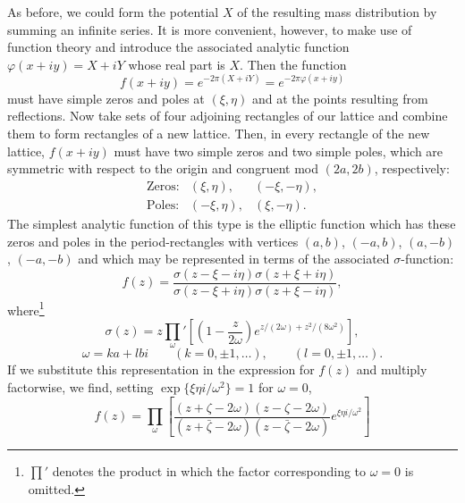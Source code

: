As before, we could form the potential $X$ of the resulting mass distribution by summing an infinite series. It is more convenient, however, to make use of function theory and introduce the associated analytic function $\varphi(x+iy)=X+iY$ whose real part is $X$. Then the function
\[
f(x+iy)=e^{-2\pi(X+iY)}=e^{-2\pi\varphi(x+iy)}
\]
must have simple zeros and poles at $(\xi,\eta)$ and at the points resulting from reflections. Now take sets of four adjoining rectangles of our lattice and combine them to form rectangles of a new lattice. Then, in every rectangle of the new lattice, $f(x+iy)$ must have two simple zeros and two simple poles, which are symmetric with respect to the origin and congruent mod $(2a,2b)$, respectively:
\[
\begin{array}{lll}
\text{Zeros:}&(\xi,\eta),&(-\xi,-\eta),\\
\text{Poles:}&(-\xi,\eta),&(\xi,-\eta).
\end{array}
\]
The simplest analytic function of this type is the elliptic function which has these zeros and poles in the period-rectangles with vertices $(a,b)$, $(-a,b)$, $(a,-b)$, $(-a,-b)$ and which may be represented in terms of the associated $\sigma$-function:
\[
f(z)=\frac{\sigma(z-\xi-i\eta)\sigma(z+\xi+i\eta)}{\sigma(z-\xi+i\eta)\sigma(z+\xi-i\eta)},
\]
where\footnote{$\prod'$ denotes the product in which the factor corresponding to $\omega=0$ is omitted.}
\[
\sigma(z)=z\prod_{\omega}'\left[\left(1-\frac{z}{2\omega}\right)e^{z/(2\omega)+z^2/(8\omega^2)}\right],
\]
\[
\omega=ka+lbi\qquad(k=0,\pm1,\ldots),\qquad(l=0,\pm1,\ldots).
\]
If we substitute this representation in the expression for $f(z)$ and multiply factorwise, we find, setting $\exp\{\xi\eta i/\omega^2\}=1$ for $\omega=0$,
\[
f(z)=\prod_{\omega}\left[\frac{(z+\zeta-2\omega)(z-\zeta-2\omega)}{(z+\bar\zeta-2\omega)(z-\bar\zeta-2\omega)}e^{\xi\eta i/\omega^2}\right]
\]
